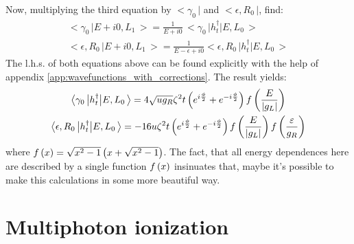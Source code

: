 Now, multiplying the third equation by $ \big<\gamma_{0}\,\big| $ and $ \big<\epsilon,R_{0}\,\big |$, find:
\begin{gather}
	\big<\gamma_{0}\,\big|E+i0,L_{1}\,\big>=\frac{1}{E+i0}\,\big<\gamma_{0}\,\big|h_{t}^{\dagger}\big|E,L_{0}\,\big>\\\big<\epsilon,R_{0}\,\big|E+i0,L_{1}\,\big>=\frac{1}{E-\epsilon+i0}\big<\epsilon,R_{0}\,\big|h_{t}^{\dagger}\big|E,L_{0}\,\big>
\end{gather}
The l.h.s. of both equations above can be found explicitly with the help of appendix \ref{app:wavefunctions_with_corrections}. The result yields:
\begin{gather}
	\big<\gamma_{0}\,\big|h_{t}^{\dagger}\big|E,L_{0}\,\big>
	=
	4\sqrt{ug_{R}}
	\zeta^{2}t
	\left(e^{i\frac{\phi}{2}}+e^{-i\frac{\phi}{2}}\right)
	f\left(\frac{E}{\left|g_L\right|}\right)
	\\
	\big<\epsilon,R_{0}\,\big|h_{t}^{\dagger}\big|E,L_{0}\,\big>
	=
	-16u\zeta^{2}t
	\left(e^{i\frac{\phi}{2}}+e^{-i\frac{\phi}{2}}\right)
	f\left(\frac{E}{\left|g_L\right|}\right)
	f\left(\frac{\varepsilon}{g_R}\right)
\end{gather}
where $ f\left(x\right)=\sqrt{x^2-1}\left(x+\sqrt{x^2-1}\right) $. The fact, that all energy dependences here are described by a single function $ f\left(x\right) $ insinuates that, maybe it's possible to make this calculations in some more beautiful way.

\section{Multiphoton ionization}